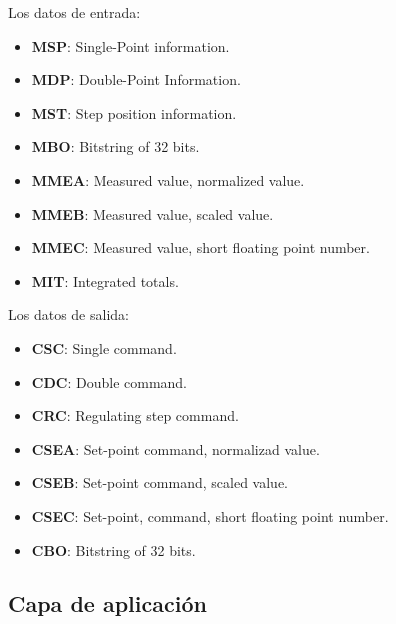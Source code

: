 \documentclass[a5paper]{book}%
\begin{document}
Los datos de entrada:

\begin{itemize}
	\item \textbf{MSP}: Single-Point information.
	\item \textbf{MDP}: Double-Point Information.
	\item \textbf{MST}: Step position information.
	\item \textbf{MBO}: Bitstring of 32 bits.
	\item \textbf{MMEA}: Measured value, normalized value.
	\item \textbf{MMEB}: Measured value, scaled value.
	\item \textbf{MMEC}: Measured value, short floating point number.
	\item \textbf{MIT}: Integrated totals.
\end{itemize}

Los datos de salida:

\begin{itemize}
	\item \textbf{CSC}: Single command.
	\item \textbf{CDC}: Double command.
	\item \textbf{CRC}: Regulating step command.
	\item \textbf{CSEA}: Set-point command, normalizad value.
	\item \textbf{CSEB}: Set-point command, scaled value.
	\item \textbf{CSEC}: Set-point, command, short floating point number.
	\item \textbf{CBO}: Bitstring of 32 bits.
\end{itemize}

\subsection{Capa de aplicación}
\end{document}
